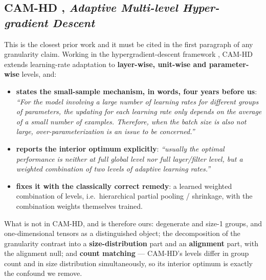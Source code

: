 \documentclass[10pt,letterpaper]{article}
\begin{document}
\subsection{CAM-HD \citep{jie2022camhd}, \emph{Adaptive Multi-level Hyper-gradient Descent}}
\label{sec:rw-camhd}

This is the closest prior work and it must be cited in the first paragraph of any granularity
claim. Working in the hypergradient-descent framework \citep{baydin2018hypergradient}, CAM-HD
extends learning-rate adaptation to \textbf{layer-wise, unit-wise and parameter-wise} levels,
and:

\begin{itemize}
\item \textbf{states the small-sample mechanism, in words, four years before us}: \emph{``For
  the model involving a large number of learning rates for different groups of parameters, the
  updating for each learning rate only depends on the average of a small number of examples.
  Therefore, when the batch size is also not large, over-parameterization is an issue to be
  concerned.''}
\item \textbf{reports the interior optimum explicitly}: \emph{``usually the optimal performance
  is neither at full global level nor full layer/filter level, but a weighted combination of
  two levels of adaptive learning rates.''}
\item \textbf{fixes it with the classically correct remedy}: a learned weighted combination of
  levels, i.e.\ hierarchical partial pooling / shrinkage, with the combination weights
  themselves trained.
\end{itemize}

What is not in CAM-HD, and is therefore ours: degenerate and size-1 groups, and
one-dimensional tensors as a distinguished object; the decomposition of the granularity
contrast into a \textbf{size-distribution} part and an \textbf{alignment} part, with the
alignment null; and \textbf{count matching} --- CAM-HD's levels differ in group count and in
size distribution simultaneously, so its interior optimum is exactly the confound we remove.
\end{document}
